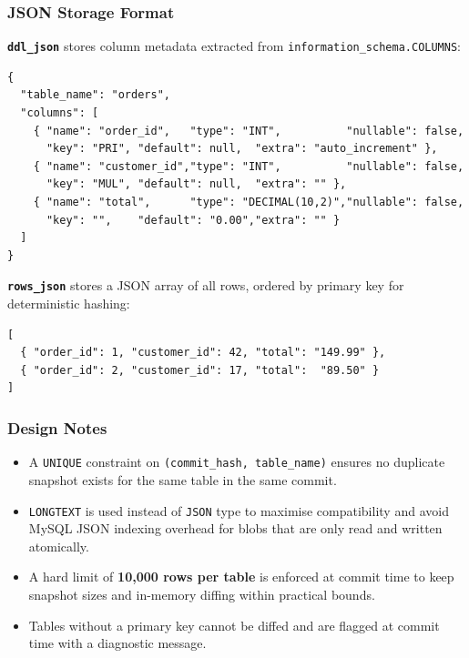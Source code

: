 \documentclass[12pt, a4paper]{article}
\begin{document}
\subsubsection*{JSON Storage Format}

\textbf{\texttt{ddl\_json}} stores column metadata extracted from
\texttt{information\_schema.COLUMNS}:
\begin{lstlisting}[style=sqlstyle, caption={Example ddl\_json structure}]
{
  "table_name": "orders",
  "columns": [
    { "name": "order_id",   "type": "INT",          "nullable": false,
      "key": "PRI", "default": null,  "extra": "auto_increment" },
    { "name": "customer_id","type": "INT",          "nullable": false,
      "key": "MUL", "default": null,  "extra": "" },
    { "name": "total",      "type": "DECIMAL(10,2)","nullable": false,
      "key": "",    "default": "0.00","extra": "" }
  ]
}
\end{lstlisting}

\textbf{\texttt{rows\_json}} stores a JSON array of all rows, ordered by primary
key for deterministic hashing:
\begin{lstlisting}[style=sqlstyle, caption={Example rows\_json structure}]
[
  { "order_id": 1, "customer_id": 42, "total": "149.99" },
  { "order_id": 2, "customer_id": 17, "total":  "89.50" }
]
\end{lstlisting}

\subsubsection*{Design Notes}
\begin{itemize}[leftmargin=1.5em]
    \item A \texttt{UNIQUE} constraint on \texttt{(commit\_hash, table\_name)}
    ensures no duplicate snapshot exists for the same table in the same commit.
    \item \texttt{LONGTEXT} is used instead of \texttt{JSON} type to maximise
    compatibility and avoid MySQL JSON indexing overhead for blobs that are only
    read and written atomically.
    \item A hard limit of \textbf{10,000 rows per table} is enforced at commit
    time to keep snapshot sizes and in-memory diffing within practical bounds.
    \item Tables without a primary key cannot be diffed and are flagged at
    commit time with a diagnostic message.
\end{itemize}

\end{document}
